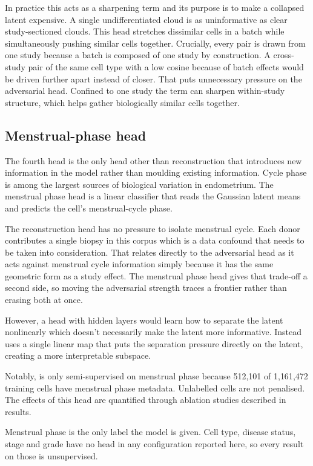 In practice this acts as a sharpening term and its purpose is to make a 
collapsed latent expensive. A single undifferentiated cloud is as 
uninformative as clear study-sectioned clouds. This head stretches 
dissimilar cells in a batch while simultaneously pushing similar cells 
together. Crucially, every pair is drawn from one study because a batch is 
composed of one study by construction. A cross-study pair of the same cell 
type with a low cosine because of batch effects would be driven further 
apart instead of closer. That puts unnecessary pressure on the adversarial 
head. Confined to one study the term can sharpen within-study structure, 
which helps gather biologically similar cells together.

\subsection*{Menstrual-phase head}

The fourth head is the only head other than reconstruction that introduces
new information in the model rather than moulding existing information. 
Cycle phase is among the largest sources of biological variation in
endometrium. The menstrual phase head is a linear classifier 
that reads the Gaussian latent means and predicts the cell's 
menstrual-cycle phase.

The reconstruction head has no pressure to isolate menstrual cycle. Each 
donor contributes a single biopsy in this corpus which is a data confound 
that needs to be taken into consideration. That relates directly to the
adversarial head as it acts against menstrual cycle information simply 
because it has the same geometric form as a study effect. The menstrual 
phase head gives that trade-off a second side, so moving the adversarial 
strength traces a frontier rather than erasing both at once.

However, a head with hidden layers would learn how to separate the latent
nonlinearly which doesn't necessarily make the latent more informative. 
Instead \elaj uses a single linear map that puts the separation pressure 
directly on the latent, creating a more interpretable subspace. 

Notably, \elaj is only semi-supervised on menstrual phase because 
512{,}101 of 1{,}161{,}472 training cells have menstrual phase metadata.
Unlabelled cells are not penalised. The effects of this head are quantified
through ablation studies described in results.

Menstrual phase is the only label the model is given. Cell type, disease 
status, stage and grade have no head in any configuration reported here, 
so every result on those is unsupervised.

